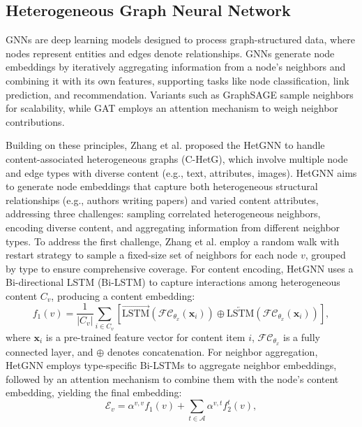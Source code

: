 \documentclass{ieeeaccess}
\begin{document}
\subsection{Heterogeneous Graph Neural Network}
\label{sec:hetgnn_theory}
GNNs are deep learning models designed to process graph-structured data, where nodes represent entities and edges denote relationships. GNNs generate node embeddings by iteratively aggregating information from a node's neighbors and combining it with its own features, supporting tasks like node classification, link prediction, and recommendation. Variants such as GraphSAGE \cite{hamilton2017inductive} sample neighbors for scalability, while GAT \cite{velivckovic2017graph} employs an attention mechanism to weigh neighbor contributions. 

Building on these principles, Zhang et al. \cite{zhang2019hetgnn} proposed the HetGNN to handle content-associated heterogeneous graphs (C-HetG), which involve multiple node and edge types with diverse content (e.g., text, attributes, images). HetGNN aims to generate node embeddings that capture both heterogeneous structural relationships (e.g., authors writing papers) and varied content attributes, addressing three challenges: sampling correlated heterogeneous neighbors, encoding diverse content, and aggregating information from different neighbor types. To address the first challenge, Zhang et al. \cite{zhang2019hetgnn} employ a random walk with restart strategy to sample a fixed-size set of neighbors for each node \( v \), grouped by type to ensure comprehensive coverage. For content encoding, HetGNN uses a Bi-directional LSTM (Bi-LSTM) to capture interactions among heterogeneous content \( C_v \), producing a content embedding:
\begin{equation}
f_1(v) = \frac{1}{|C_v|} \sum_{i \in C_v} \left[ \overrightarrow{\text{LSTM}}(\mathcal{FC}_{\theta_x}(\mathbf{x}_i)) \oplus \overleftarrow{\text{LSTM}}(\mathcal{FC}_{\theta_x}(\mathbf{x}_i)) \right],
\end{equation}
where \( \mathbf{x}_i \) is a pre-trained feature vector for content item \( i \), \( \mathcal{FC}_{\theta_x} \) is a fully connected layer, and \( \oplus \) denotes concatenation. For neighbor aggregation, HetGNN employs type-specific Bi-LSTMs to aggregate neighbor embeddings, followed by an attention mechanism to combine them with the node's content embedding, yielding the final embedding:
\begin{equation}
\mathcal{E}_v = \alpha^{v,v} f_1(v) + \sum_{t \in \mathcal{A}} \alpha^{v,t} f_2^t(v),
\end{equation}
\end{document}
